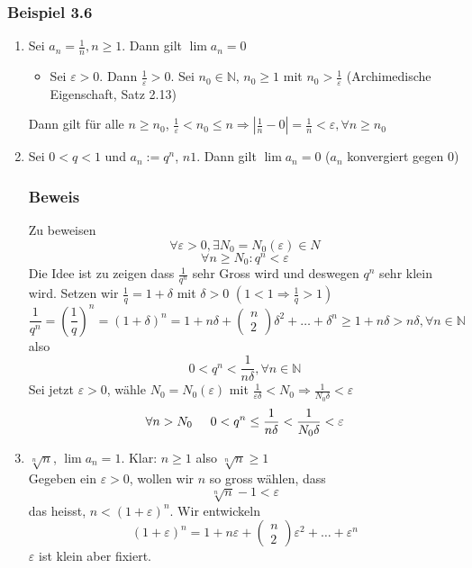 \subsubsection*{Beispiel 3.6}
\begin{enumerate}
\item Sei $a_n=\frac{1}{n}, n\geq 1$. Dann gilt $\lim a_n=0$ 
\begin{itemize}
\item Sei $\varepsilon>0$. Dann $\frac{1}{\varepsilon}>0$. Sei $n_0\in\mathbb{N}$, $n_0\geq 1$ mit $n_0>\frac{1}{\varepsilon}$ (Archimedische Eigenschaft, Satz 2.13)\\ 
\end{itemize}
Dann gilt für alle $n\geq n_0$, $\frac{1}{\varepsilon}<n_0\leq n \Rightarrow \left| \frac{1}{n}-0\right| = \frac{1}{n}<\varepsilon, \forall n\geq n_0$
\item Sei $0<q<1$ und $a_n:=q^n$, $n 1$. Dann gilt $\lim a_n=0$ ($a_n$ konvergiert gegen 0)
\subsubsection*{Beweis}
Zu beweisen $$\forall \varepsilon > 0, \exists N_0=N_0(\varepsilon)\in N$$$$\forall n\geq N_0:q^n <\varepsilon$$
Die Idee ist zu zeigen dass $\frac{1}{q^n}$ sehr Gross wird und deswegen $q^n$ sehr klein wird. Setzen wir $\frac{1}{q}=1+\delta$ mit $\delta>0$ $\left( 1<1\Rightarrow \frac{1}{q}>1\right)$%
 $$\frac{1}{q^n}=\left( \frac{1}{q}\right)^n=\left( 1+\delta\right)^n=1+n\delta +\left( {\begin{array}{*{20}{c}}
n\\
2
\end{array}} \right) \delta^2+\dots+\delta^n\geq 1+n\delta>n\delta, \forall n\in\mathbb{N}$$
also $$0<q^n<\frac{1}{n\delta}, \forall n\in\mathbb{N}$$
Sei jetzt $\varepsilon >0$, wähle $N_0=N_0(\varepsilon)$ mit $\frac{1}{\varepsilon\delta}<N_0\Rightarrow \frac{1}{N_0\delta}<\varepsilon$
$$\forall n>N_0\hspace{5mm}0<q^n\leq\frac{1}{n\delta}<\frac{1}{N_0\delta}<\varepsilon$$
\item $\sqrt[n]{n}$, $\lim a_n=1$. Klar: $n\geq 1$ also $\sqrt[n]{n}\geq 1$\\
Gegeben ein $\varepsilon>0$, wollen wir $n$ so gross wählen, dass $$\sqrt[n]{n}-1 <\varepsilon$$ das heisst, $n<\left( 1+\varepsilon \right)^n$. Wir entwickeln $$\left( 1+\varepsilon\right)^n=1+n\varepsilon+\left( {\begin{array}{*{20}{c}}
n\\
2
\end{array}} \right) \varepsilon^2 + \dots +\varepsilon^n$$
$\varepsilon$ ist klein aber fixiert.\\


\end{enumerate}
